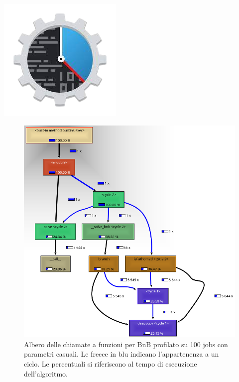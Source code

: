 \documentclass[compress]{beamer}
\begin{document}
    \begin{frame}{\subsecname \hfill \includegraphics[scale=0.08]{figs/kCacheGrindLogo-removebg-preview.png}}
        \begin{figure}
            \includegraphics[scale=0.27]{../proofs/bnb_100_callstack.png}
            \caption[]{Albero delle chiamate a funzioni per BnB profilato su 100 jobs con parametri casuali.
            Le frecce in blu indicano l'appartenenza a un ciclo. Le percentuali si riferiscono
            al tempo di esecuzione dell'algoritmo.}
        \end{figure}        
    \end{frame}
\end{document}
